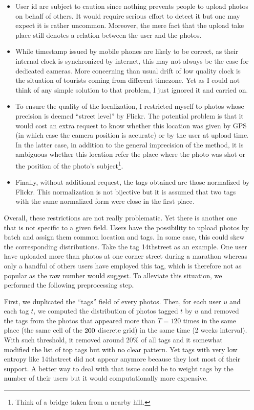 \begin{itemize}
	\item User id are subject to caution since nothing prevents people to
 upload photos on behalf of others. It would require serious effort to
 detect it but one may expect it is rather uncommon. Moreover, the mere
 fact that the upload take place still denotes a relation between the
 user and the photos.
	\item While timestamp issued by mobile phones are likely to be correct,
 as their internal clock is synchronized by internet, this may not
 always be the case for dedicated cameras. More concerning than usual
 drift of low quality clock is the situation of tourists coming from
 different timezone. Yet as I could not think of any simple solution to
 that problem, I just ignored it and carried on.
	\item To ensure the quality of the localization, I restricted myself to
 photos whose precision is deemed \enquote{street level} by Flickr. The
 potential problem is that it would cost an extra request to know
 whether this location was given by GPS (in which case the camera
 position is accurate) or by the user at upload time. In the latter
 case, in addition to the general imprecision of the method, it is
 ambiguous whether this location refer the place where the photo was
 shot or the position of the photo's subject\footnote{Think of a bridge
 taken from a nearby hill.}.
	\item Finally, without additional request, the tags obtained are those
 normalized by Flickr. This normalization is not bijective but it is
 assumed that two tags with the same normalized form were close in the
 first place.
\end{itemize}

Overall, these restrictions are not really problematic. Yet there is another
one that is not specific to a given field. Users have the possibility to
upload photos by batch and assign them common location and tags. In some case,
this could skew the corresponding distributions. Take the tag
\textsf{14thstreet} as an example. One user have uploaded more than
 photos at one corner street during a marathon whereas only a
handful of others users have employed this tag, which is therefore not as
popular as the raw number would suggest. To alleviate this situation, we
performed the following preprocessing step.

First, we duplicated the \enquote{tags} field of every photos. Then, for each
user $u$ and each tag $t$, we computed the distribution of photos tagged $t$ by
$u$ and removed the tags from the photos that appeared more than $T=120$ times
in the same place (the same cell of the $200\time 200$ discrete grid) in the same
time (2 weeks interval). With such threshold, it removed around 20\% of all
tags and it somewhat modified the list of top tags but with no clear pattern.
Yet tags with very low entropy like \textsf{14thstreet} did not appear
anymore because they lost most of their support. A better way to deal with
that issue could be to weight tags by the number of their users but it would
computationally more expensive.
